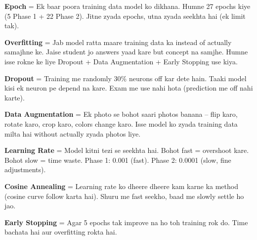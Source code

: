 \documentclass[11pt,a4paper]{article}
\begin{document}
\begin{qabox}
\textbf{Epoch} = Ek baar poora training data model ko dikhana. Humne 27 epochs kiye (5 Phase 1 + 22 Phase 2). Jitne zyada epochs, utna zyada seekhta hai (ek limit tak).
\end{qabox}
\vspace{0.2cm}

\begin{qabox}
\textbf{Overfitting} = Jab model ratta maare training data ka instead of actually samajhne ke. Jaise student jo answers yaad kare but concept na samjhe. Humne isse rokne ke liye Dropout + Data Augmentation + Early Stopping use kiya.
\end{qabox}
\vspace{0.2cm}

\begin{qabox}
\textbf{Dropout} = Training me randomly 30\% neurons off kar dete hain. Taaki model kisi ek neuron pe depend na kare. Exam me use nahi hota (prediction me off nahi karte).
\end{qabox}
\vspace{0.2cm}

\begin{qabox}
\textbf{Data Augmentation} = Ek photo se bohot saari photos banana -- flip karo, rotate karo, crop karo, colors change karo. Isse model ko zyada training data milta hai without actually zyada photos liye.
\end{qabox}
\vspace{0.2cm}

\begin{qabox}
\textbf{Learning Rate} = Model kitni tezi se seekhta hai. Bohot fast = overshoot kare. Bohot slow = time waste. Phase 1: 0.001 (fast). Phase 2: 0.0001 (slow, fine adjustments).
\end{qabox}
\vspace{0.2cm}

\begin{qabox}
\textbf{Cosine Annealing} = Learning rate ko dheere dheere kam karne ka method (cosine curve follow karta hai). Shuru me fast seekho, baad me slowly settle ho jao.
\end{qabox}
\vspace{0.2cm}

\begin{qabox}
\textbf{Early Stopping} = Agar 5 epochs tak improve na ho toh training rok do. Time bachata hai aur overfitting rokta hai.
\end{qabox}
\vspace{0.2cm}
\end{document}
